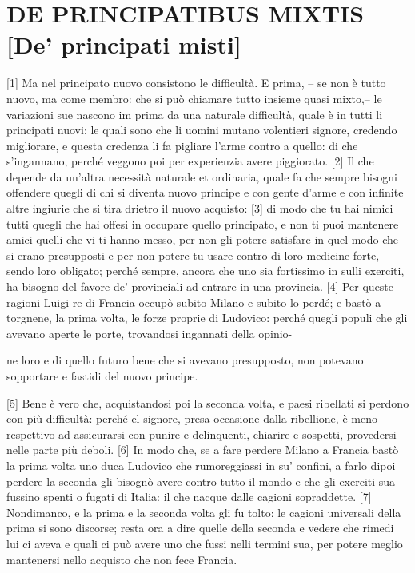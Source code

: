 \quebra\section{DE PRINCIPATIBUS MIXTIS\break
{[}De' principati misti{]}}

{[}1{]} Ma nel principato nuovo consistono le difficultà. E prima, -- se
non è tutto nuovo, ma come membro: che si può chiamare tutto insieme
quasi mixto,-- le variazioni sue nascono im prima da una naturale
difficultà, quale è in tutti li principati nuovi: le quali sono che li
uomini mutano volentieri signore, credendo migliorare, e questa credenza
li fa pigliare l'arme contro a quello: di che s'ingannano, perché
veggono poi per experienzia avere piggiorato. {[}2{]} Il che depende da
un'altra necessità naturale et ordinaria, quale fa che sempre bisogni
offendere quegli di chi si diventa nuovo principe e con gente d'arme e
con infinite altre ingiurie che si tira drietro il nuovo acquisto:
{[}3{]} di modo che tu hai nimici tutti quegli che hai offesi in
occupare quello principato, e non ti puoi mantenere amici quelli che vi
ti hanno messo, per non gli potere satisfare in quel modo che si erano
presupposti e per non potere tu usare contro di loro medicine forte,
sendo loro obligato; perché sempre, ancora che uno sia fortissimo in
sulli exerciti, ha bisogno del favore de' provinciali ad entrare in una
provincia. {[}4{]} Per queste ragioni Luigi  re di Francia occupò
subito Milano e subito lo perdé; e bastò a torgnene, la prima volta, le
forze proprie di Ludovico: perché quegli populi che gli avevano aperte
le porte, trovandosi ingannati della opinio-

\pagebreak

\noindent{}ne loro e di quello futuro
bene che si avevano presupposto, non potevano sopportare e fastidi del
nuovo principe.

{[}5{]} Bene è vero che, acquistandosi poi la seconda volta, e paesi
ribellati si perdono con più difficultà: perché el signore, presa
occasione dalla ribellione, è meno respettivo ad assicurarsi con punire
e delinquenti, chiarire e sospetti, provedersi nelle parte più deboli.
{[}6{]} In modo che, se a fare perdere Milano a Francia bastò la prima
volta uno duca Ludovico che rumoreggiassi in su' confini, a farlo dipoi
perdere la seconda gli bisognò avere contro tutto il mondo e che gli
exerciti sua fussino spenti o fugati di Italia: il che nacque dalle
cagioni sopraddette. {[}7{]} Nondimanco, e la prima e la seconda volta
gli fu tolto: le cagioni universali della prima si sono discorse; resta
ora a dire quelle della seconda e vedere che rimedi lui ci aveva e quali
ci può avere uno che fussi nelli termini sua, per potere meglio
mantenersi nello acquisto che non fece Francia.

